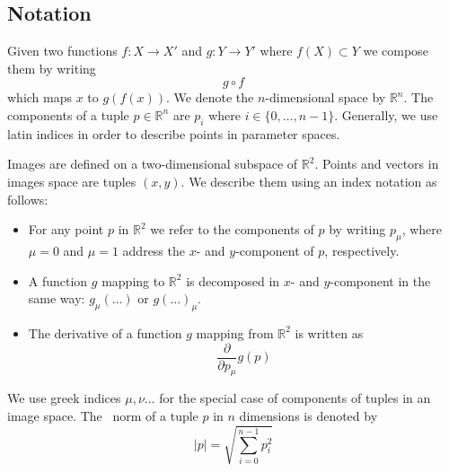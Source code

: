\documentclass[10pt,a4paper]{article}
\newcommand{\Rpow}[1]{\mathbb{R}^{#1}}
\newcommand{\norm}[1]{\left|#1\right|}
\begin{document}
\subsection{Notation}
Given two functions $f:X\rightarrow X'$ and $g:Y\rightarrow Y'$ where $f(X)\subset Y$ we compose them by writing
\begin{equation}
g\circ f
\end{equation}
which maps $x$ to $g(f(x))$.
We denote the $n$-dimensional space by $\Rpow{n}$.
The components of a tuple $p\in\Rpow{n}$ are $p_i$ where $i\in\{0,\ldots,n-1\}$.
Generally, we use latin indices in order to describe points in parameter spaces.

Images are defined on a two-dimensional subspace of $\Rpow{2}$.
Points and vectors in images space are tuples $(x,y)$. We describe them using an index notation as follows:
\begin{itemize}
\item
For any point $p$ in $\Rpow{2}$ we refer to the components of $p$ by writing $p_\mu$,
where $\mu = 0$ and $\mu = 1$ address the $x$- and $y$-component of $p$, respectively.
\item A function $g$ mapping to $\Rpow{2}$ is decomposed in $x$- and $y$-component in the same way:
$g_\mu(\ldots)$ or $g(\ldots)_\mu$.
\item The derivative of a function $g$ mapping from $\Rpow{2}$ is written as
\begin{equation}
\frac \partial {\partial p_\mu} g(p)
\end{equation}
\end{itemize}
We use greek indices $\mu,\nu\ldots$ for the special case of components of tuples in an image space.
The \euclidian\ norm of a tuple $p$ in $n$ dimensions is denoted by
\begin{equation}
\norm{p} = \sqrt{\sum_{i=0}^{n-1} p_i^2}
\end{equation}
\end{document}
